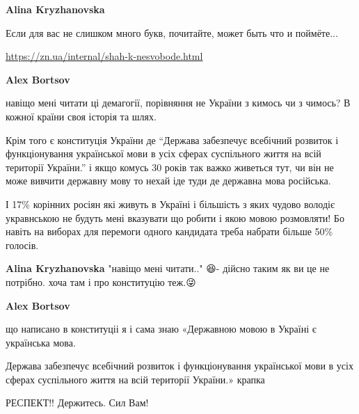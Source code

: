 \begin{itemize}
\begin{itemize}
\textbf{Alina Kryzhanovska} 

Если для вас не слишком много букв, почитайте, может быть что и поймёте... \par
\url{https://zn.ua/internal/shah-k-nesvobode.html}


\textbf{Alex Bortsov}

навіщо мені читати ці демагогії, порівняння не України з кимось чи з чимось? В
кожної країни своя історія та шлях.

Крім того є конституція України де \enquote{Держава забезпечує всебічний розвиток і
функціонування української мови в усіх сферах суспільного життя на всій
території України.} і якщо комусь 30 років так важко живеться тут, чи він не
може вивчити державну мову то нехай іде туди де державна мова російська.

І 17\% корінних росіян які живуть в Україні і більшість з яких чудово володіє
укравнською не будуть мені вказувати що робити і якою мовою розмовляти! Бо
навіть на виборах для перемоги одного кандидата треба набрати більше 50\%
голосів.


\textbf{Alina Kryzhanovska} "навіщо мені читати.." 😆- дійсно таким як ви це не
потрібно. хоча там і про конституцію теж.😜


\textbf{Alex Bortsov} 

що написано в конституціі я і сама знаю «Державною мовою в Україні є українська
мова.

Держава забезпечує всебічний розвиток і функціонування української мови в усіх
сферах суспільного життя на всій території України.» крапка

\end{itemize}



РЕСПЕКТ!! Держитесь. Сил Вам!



\end{itemize}
